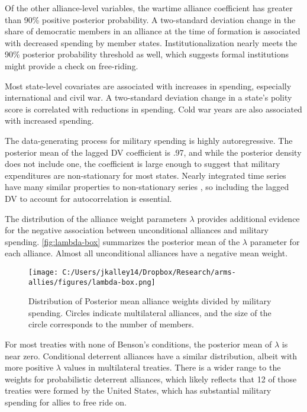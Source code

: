 \documentclass[12pt]{article}
\begin{document}
Of the other alliance-level variables, the wartime alliance coefficient has greater than 90\% positive posterior probability. A two-standard deviation change in the share of democratic members in an alliance at the time of formation is associated with decreased spending by member states. Institutionalization nearly meets the 90\% posterior probability threshold as well, which suggests formal institutions might provide a check on free-riding. 

Most state-level covariates are associated with increases in spending, especially international and civil war. A two-standard deviation change in a state's polity score is correlated with reductions in spending. Cold war years are also associated with increased spending.

The data-generating process for military spending is highly autoregressive. The posterior mean of the lagged DV coefficient is .97, and while the posterior density does not include one, the coefficient is large enough to suggest that military expenditures are non-stationary for most states. Nearly integrated time series have many similar properties to non-stationary series \citep{DeBoefGranato1997}, so including the lagged DV to account for autocorrelation is essential. 

The distribution of the alliance weight parameters $\lambda$ provides additional evidence for the negative association between unconditional alliances and military spending. \autoref{fig:lambda-box} summarizes the posterior mean of the $\lambda$ parameter for each alliance. Almost all unconditional alliances have a negative mean weight.  

\begin{figure}[htbp]
	\centering
		\texttt{[image: C:/Users/jkalley14/Dropbox/Research/arms-allies/figures/lambda-box.png]}
	\caption{Distribution of Posterior mean alliance weights divided by military spending. Circles indicate multilateral alliances, and the size of the circle corresponds to the number of members.}
	\label{fig:lambda-box}
\end{figure}

For most treaties with none of Benson's conditions, the posterior mean of $\lambda$ is near zero. Conditional deterrent alliances have a similar distribution, albeit with more positive $\lambda$ values in multilateral treaties. There is a wider range to the weights for probabilistic deterrent alliances, which likely reflects that 12 of those treaties were formed by the United States, which has substantial military spending for allies to free ride on. 
\end{document}
